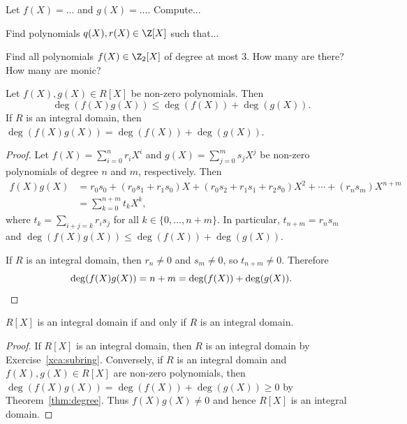 \documentclass[12pt]{amsproc}
\begin{document}
\begin{exercise}
    Let $f(X)=...$ and $g(X)=...$. Compute...
\end{exercise}

\begin{example}
    Find polynomials $q(X),r(X)\in \Z[X]$ such that...
\end{example}

\begin{exercise}
    Find all polynomials $f(X)\in \Z_2[X]$ of degree at most $3$. How many are there? How many are monic?
\end{exercise}

\begin{theorem}
\label{thm:degree}
Let $f(X),g(X)\in R[X]$ be non-zero polynomials. Then 
\[ 
\deg(f(X)g(X))\leq \deg(f(X))+\deg(g(X)).
\] 
If $R$ is an integral domain, 
then $\deg(f(X)g(X))=\deg(f(X))+\deg(g(X))$.
\end{theorem}

\begin{proof}
    Let $f(X)=\sum_{i=0}^n r_iX^i$ and $g(X)=\sum_{j=0}^m s_jX^j$ be non-zero polynomials of degree $n$ and $m$, respectively. Then
\begin{align*}
f(X)g(X)&=r_0s_0+(r_0s_1+r_1s_0)X+(r_0s_2+r_1s_1+r_2s_0)X^2+\cdots+(r_ns_m)X^{n+m}\\
&= \sum_{k=0}^{n+m} t_k X^k,
\end{align*}
where $t_k=\sum_{i+j=k} r_is_j$ for all $k\in\{0,\dots,n+m\}$. In particular, $t_{n+m}=r_ns_m$ 
and $\deg(f(X)g(X))\leq \deg(f(X))+\deg(g(X))$. 

If $R$ is an integral domain, then $r_n\neq 0$ and $s_m\neq 0$, so $t_{n+m}\neq 0$. Therefore
\[
\deg(f(X)g(X))=n+m=\deg(f(X))+\deg(g(X)).\qedhere    
\]
\end{proof}

\begin{corollary}
    $R[X]$ is an integral domain if and only if $R$ is an integral domain.
\end{corollary}

\begin{proof}
    If $R[X]$ is an integral domain, then $R$ is an integral domain by Exercise~\ref{xca:subring}. Conversely, if $R$ is an integral domain and $f(X),g(X)\in R[X]$ are non-zero polynomials, then $\deg(f(X)g(X))=\deg(f(X))+\deg(g(X))\ge 0$ by Theorem~\ref{thm:degree}. Thus 
    $f(X)g(X)\neq 0$ and hence $R[X]$ is an integral domain.
\end{proof}
\end{document}
